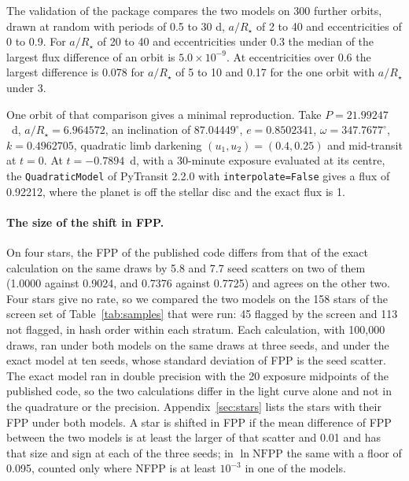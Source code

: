 \documentclass[11pt]{article}
\begin{document}
The validation of the package compares the two models on 300 further orbits, drawn at random with periods of 0.5 to 30 d, $a/R_\star$ of 2 to 40 and eccentricities of 0 to 0.9. For $a/R_\star$ of 20 to 40 and eccentricities under 0.3 the median of the largest flux difference of an orbit is $5.0\times10^{-9}$. At eccentricities over 0.6 the largest difference is 0.078 for $a/R_\star$ of 5 to 10 and 0.17 for the one orbit with $a/R_\star$ under 3.

One orbit of that comparison gives a minimal reproduction. Take $P=21.99247$~d, $a/R_\star=6.964572$, an inclination of $87.04449^{\circ}$, $e=0.8502341$, $\omega=347.7677^{\circ}$, $k=0.4962705$, quadratic limb darkening $(u_1,u_2)=(0.4,0.25)$ and mid-transit at $t=0$. At $t=-0.7894$~d, with a 30-minute exposure evaluated at its centre, the \texttt{QuadraticModel} of PyTransit 2.2.0 with \texttt{interpolate=False} gives a flux of 0.92212, where the planet is off the stellar disc and the exact flux is 1.

\paragraph{The size of the shift in FPP.} On four stars, the FPP of the published code differs from that of the exact calculation on the same draws by 5.8 and 7.7 seed scatters on two of them (1.0000 against 0.9024, and 0.7376 against 0.7725) and agrees on the other two. Four stars give no rate, so we compared the two models on the 158 stars of the screen set of Table~\ref{tab:samples} that were run: 45 flagged by the screen and 113 not flagged, in hash order within each stratum. Each calculation, with 100,000 draws, ran under both models on the same draws at three seeds, and under the exact model at ten seeds, whose standard deviation of FPP is the seed scatter. The exact model ran in double precision with the 20 exposure midpoints of the published code, so the two calculations differ in the light curve alone and not in the quadrature or the precision. Appendix~\ref{sec:stars} lists the stars with their FPP under both models. A star is shifted in FPP if the mean difference of FPP between the two models is at least the larger of that scatter and 0.01 and has that size and sign at each of the three seeds; in $\ln\mathrm{NFPP}$ the same with a floor of 0.095, counted only where NFPP is at least $10^{-3}$ in one of the models.
\end{document}
